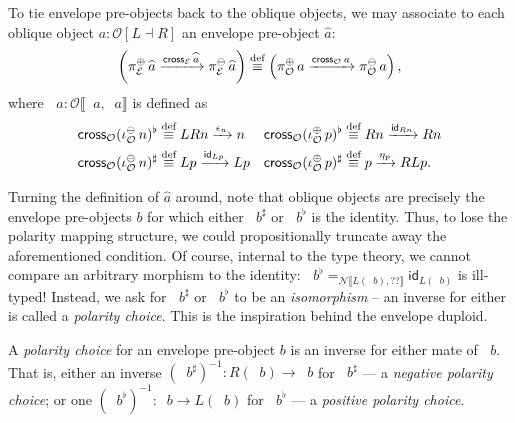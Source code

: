 \documentclass[runningheads]{llncs}
\newcommand*\rocqlogo{\usebox{\rocqlogobox}}
\newcommand{\lemmaref}[3]{\href{https://github.com/UniMath/UniMath/blob/94fae0eda57a778cec704bfa73b4ff525c9bc475/#1\#L#2?name=#3}{\rocqlogo}}
\newcommand{\acat}[1]{\mathcal{#1}}
\newcommand{\NN}{\acat{N}}
\newcommand{\OO}{\acat{O}}
\newcommand{\EE}{\acat{E}}
\newcommand{\Obl}[1]{\OO[#1]}
\newcommand{\id}{\mathsf{id}}
\newcommand{\morsof}[3]{{#1}\llbracket{#2},{#3}\rrbracket}
\newcommand{\defequiv}{\overset{\mathrm{\textup{def}}}{\equiv}}
\newcommand{\projnegE}{\mathop{\pi^{\ominus}_{\EE}}}
\newcommand{\projposE}{\mathop{\pi^{\oplus}_{\EE}}}
\newcommand{\crossmorE}{\mathop{\mathsf{cross}_{\EE}}}
\newcommand{\innegO}{\mathop{\iota^{\ominus}_{\OO}}}
\newcommand{\inposO}{\mathop{\iota^{\oplus}_{\OO}}}
\newcommand{\projnegO}{\mathop{\pi^{\ominus}_{\OO}}}
\newcommand{\projposO}{\mathop{\pi^{\oplus}_{\OO}}}
\newcommand{\crossmorO}{\mathop{\mathsf{cross}_{\OO}}}
\begin{document}
\begin{definition}[{\lemmaref{UniMath/CategoryTheory/Nonassociative/Duploids/FromAdjunction/Envelope.v}{337}{envelope\_preob\_of\_positive}}]
\label{def:oblique-cross-mor}
To tie envelope pre\hyp{}objects back to the oblique objects, we may
associate to each oblique object \(a : \Obl{L \dashv R}\) an envelope
pre\hyp{}object \(\widehat{a}\): \[\left(\projposE{\widehat{a}}
\xrightarrow{\crossmorE{\widehat{a}}} \projnegE{\widehat{a}}\right)
\defequiv \left(\projposO{a} \xrightarrow{\crossmorO{a}}
\projnegO{a}\right)\mathpunct,\] where \(\crossmorO{a} :
\morsof\OO{\projposO{a}}{\projnegO{a}}\) is defined as
\begin{align*}
\crossmorO(\innegO{n})^\flat &\defequiv LRn \xrightarrow{\epsilon_n} n
& \crossmorO(\inposO{p})^\flat &\defequiv Rn \xrightarrow{\id_{Rn}} Rn \\
\crossmorO(\innegO{n})^\sharp &\defequiv Lp \xrightarrow{\id_{Lp}} Lp
& \crossmorO(\inposO{p})^\sharp &\defequiv p \xrightarrow{\eta_p} RLp \mathpunct.
\end{align*}
\end{definition}

Turning the definition of \(\widehat{a}\) around, note that oblique
objects are precisely the envelope pre\hyp{}objects \(b\) for which either
\(\crossmorE{b}^\sharp\) or \(\crossmorE{b}^\flat\) is the
identity. Thus, to lose the polarity mapping structure, we could
propositionally truncate away the aforementioned condition. Of course,
internal to the type theory, we cannot compare an arbitrary morphism
to the identity: \(\crossmorE{b}^\flat
=_{\morsof\NN{L(\projposE{b})}{\textbf{??}}}  \id_{L(\projposE{b})}\)
is ill\hyp{}typed! Instead, we ask for \(\crossmorE{b}^\sharp\) or
\(\crossmorE{b}^\flat\) to be an \emph{isomorphism} -- an inverse for
either is called a \emph{polarity choice}. This is the inspiration behind
the envelope duploid.

\begin{definition}[{\lemmaref{UniMath/CategoryTheory/Nonassociative/Duploids/FromAdjunction/Envelope.v}{81}{envelope\_polarization\_choice}}]
A \emph{polarity choice} for an envelope pre\hyp{}object \(b\) is an
inverse for either mate of \(\crossmorE b\). That is, either an inverse
\((\crossmorE b^\sharp)^{-1} \colon R(\projnegE{b}) \to \projposE{b}\)
for \(\crossmorE b^\sharp\) --- a \emph{negative polarity choice}; or
one \((\crossmorE b^\flat)^{-1} \colon \projnegE{b} \to
L(\projposE{b})\) for \(\crossmorE b^\flat\) --- a \emph{positive
polarity choice}.
\end{definition}
\end{document}

